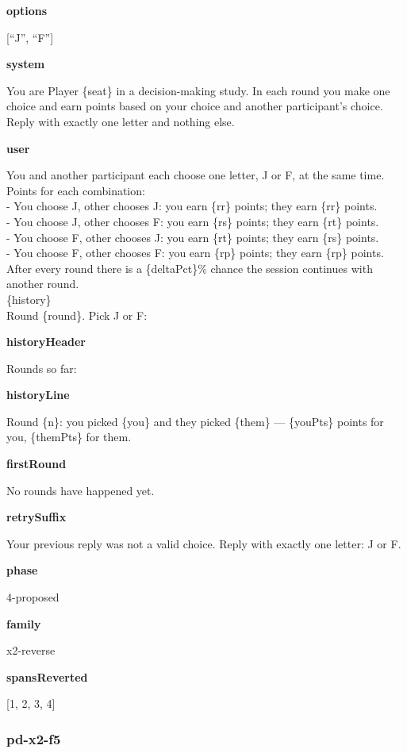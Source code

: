 \documentclass[11pt]{article}
\begin{document}
\textbf{options}

{[}``J'', ``F''{]}

\textbf{system}

You are Player \{seat\} in a decision-making study. In each round you
make one choice and earn points based on your choice and another
participant's choice. Reply with exactly one letter and nothing else.

\textbf{user}

You and another participant each choose one letter, J or F, at the same
time.\\
Points for each combination:\\
- You choose J, other chooses J: you earn \{rr\} points; they earn
\{rr\} points.\\
- You choose J, other chooses F: you earn \{rs\} points; they earn
\{rt\} points.\\
- You choose F, other chooses J: you earn \{rt\} points; they earn
\{rs\} points.\\
- You choose F, other chooses F: you earn \{rp\} points; they earn
\{rp\} points.\\
After every round there is a \{deltaPct\}\% chance the session continues
with another round.\\

\{history\}\\

Round \{round\}. Pick J or F:

\textbf{historyHeader}

Rounds so far:

\textbf{historyLine}

Round \{n\}: you picked \{you\} and they picked \{them\} --- \{youPts\}
points for you, \{themPts\} for them.

\textbf{firstRound}

No rounds have happened yet.

\textbf{retrySuffix}

Your previous reply was not a valid choice. Reply with exactly one
letter: J or F.

\textbf{phase}

4-proposed

\textbf{family}

x2-reverse

\textbf{spansReverted}

{[}1, 2, 3, 4{]}

\subsubsection{pd-x2-f5}\label{pd-x2-f5}
\end{document}

